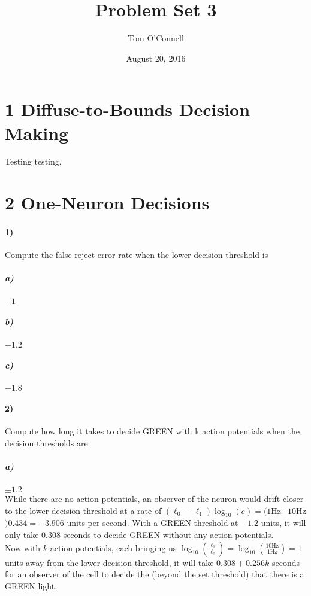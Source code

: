 \documentclass[10pt,letter]{article}
\begin{document}


\title{Problem Set 3}

\author{Tom O'Connell}

\date{August 20, 2016}
 
\maketitle 


\section*{1 Diffuse-to-Bounds Decision Making}

Testing testing.


\section*{2 One-Neuron Decisions}

\paragraph{1)} Compute the false reject error rate when the lower decision threshold is

\subparagraph{a)} $-1$

\subparagraph{b)} $-1.2$

\subparagraph{c)} $-1.8$

\paragraph{2)} Compute how long it takes to decide GREEN with k action potentials when the decision
thresholds are

\subparagraph{a)} $\pm 1.2$\\

While there are no action potentials, an observer of the neuron would drift closer to the lower 
decision threshold at a rate of $(\ell_0 - \ell_1)\log_{10}(e) = (1 $Hz$ - 10 $Hz$)  0.434 = -3.906$
units per second. With a GREEN threshold at $-1.2$ units, it will only take $0.308$ seconds to 
decide GREEN without any action potentials.\\

Now with $k$ action potentials, each bringing us $\log_{10}(\frac{\ell_1}{\ell_0}) = \log_{10}(
\frac{10 \text{Hz}}{1 \text{Hz}}) = 1 $ units away from the lower decision threshold, 
it will take $0.308 + 0.256 k$ seconds 
for an observer of the cell to decide the (beyond the set threshold) that there is a GREEN light.\\
\end{document}
